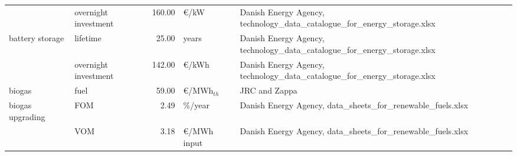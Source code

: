 \begin{longtable}{p{4cm}p{4cm}rp{3cm}p{10cm}}
                      & overnight investment &       160.00 &                      \euro/kW &                                                                                                                                                                                                                                                         Danish Energy Agency, technology\_data\_catalogue\_for\_energy\_storage.xlsx \\
battery storage & lifetime &        25.00 &                         years &                                                                                                                                                                                                                                                         Danish Energy Agency, technology\_data\_catalogue\_for\_energy\_storage.xlsx \\
                      & overnight investment &       142.00 &                     \euro/kWh &                                                                                                                                                                                                                                                         Danish Energy Agency, technology\_data\_catalogue\_for\_energy\_storage.xlsx \\
biogas & fuel &        59.00 &              \euro/MWh$_{th}$ &                                                                                                                                                                                                                                                                                                                        JRC and Zappa \\
biogas upgrading & FOM &         2.49 &                       \%/year &                                                                                                                                                                                                                                                                       Danish Energy Agency, data\_sheets\_for\_renewable\_fuels.xlsx \\
                      & VOM &         3.18 &               \euro/MWh input &                                                                                                                                                                                                                                                                       Danish Energy Agency, data\_sheets\_for\_renewable\_fuels.xlsx \\

\end{longtable}
